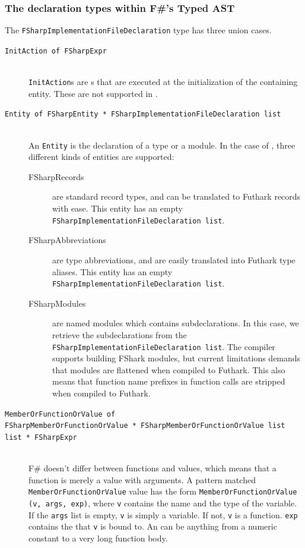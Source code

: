 \subsubsection*{The declaration types within F\#'s Typed AST}
The \texttt{FSharpImplementationFileDeclaration} type has three union cases.
\begin{description}
\item[\texttt{InitAction of FSharpExpr}] \hfill\\
  \texttt{InitAction}s are \fsharpexpr{}s that are executed at the
  initialization of the containing entity. These are not supported in \fshark{}.

\item[\texttt{Entity of FSharpEntity * FSharpImplementationFileDeclaration list}]\hfill\\
  An \texttt{Entity} is the declaration of a type or a module. In the case of
  \fshark{}, three different kinds of entities are supported:
  \begin{description}
  \item[FSharpRecords] are standard record types, and can be translated to
    Futhark records with ease.
    This entity has an empty \texttt{FSharpImplementationFileDeclaration list}.
  \item[FSharpAbbreviations] are type abbreviations, and are easily translated
    into Futhark type aliases.
    This entity has an empty \texttt{FSharpImplementationFileDeclaration list}.
  \item[FSharpModules] are named modules which contains subdeclarations.
    In this case, we retrieve the subdeclarations from the \texttt{FSharpImplementationFileDeclaration list}.
    The \fshark{} compiler supports building FShark modules, but current
    limitations demands that modules are flattened when compiled to Futhark.
    This also means that function name prefixes in function calls are stripped
    when compiled to Futhark.
  \end{description}
\item[\texttt{MemberOrFunctionOrValue of \\ FSharpMemberOrFunctionOrValue *
    FSharpMemberOrFunctionOrValue list list * FSharpExpr}]\hfill\\
  F\# doesn't differ between functions and values, which means that a function
  is merely a value with arguments.
  A pattern matched \texttt{MemberOrFunctionOrValue} value has the form
  \texttt{MemberOrFunctionOrValue (v, args, exp)}, where \texttt{v} contains the
  name and the type of the variable.
  If the \texttt{args} list is empty, \texttt{v} is simply a variable. If not,
  \texttt{v} is a function. \texttt{exp} contains the \fsharpexpr{} that
  \texttt{v} is bound to. An \fsharpexpr{} can be anything from a numeric
  constant to a very long function body.
\end{description}

